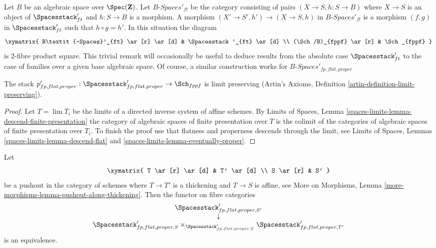 \begin{remark}
\label{remark-spaces-base-change}
Let $B$ be an algebraic space over $\Spec(\mathbf{Z})$.
Let $B\textit{-Spaces}'_{ft}$ be the category consisting
of pairs $(X \to S, h : S \to B)$
where $X \to S$ is an object of
$\Spacesstack'_{ft}$ and $h : S \to B$ is a morphism.
A morphism $(X' \to S', h') \to (X \to S, h)$
in $B\textit{-Spaces}'_{ft}$ is a morphism $(f, g)$
in $\Spacesstack'_{ft}$ such that $h \circ g = h'$.
In this situation the diagram
$$
\xymatrix{
B\textit{-Spaces}'_{ft} \ar[r] \ar[d] & \Spacesstack'_{ft} \ar[d] \\
(\Sch/B)_{fppf} \ar[r] & \Sch_{fppf}
}
$$
is $2$-fibre product square. This trivial remark
will occasionally be useful to deduce results from
the absolute case $\Spacesstack'_{ft}$ to the case
of families over a given base algebraic space.
Of course, a similar construction works for
$B\textit{-Spaces}'_{fp, flat, proper}$
\end{remark}

\begin{lemma}
\label{lemma-spaces-limits}
The stack
$p'_{fp, flat, proper} :
\Spacesstack'_{fp, flat, proper} \to \Sch_{fppf}$ is limit preserving
(Artin's Axioms, Definition \ref{artin-definition-limit-preserving}).
\end{lemma}

\begin{proof}
Let $T = \lim T_i$ be the limits of a
directed inverse system of affine schemes.
By Limits of Spaces, Lemma
\ref{spaces-limits-lemma-descend-finite-presentation}
the category of algebraic spaces of finite presentation
over $T$ is the colimit of the categories of algebraic spaces
of finite presentation over $T_i$.
To finish the proof use that flatness and properness
descends through the limit, see
Limits of Spaces, Lemmas
\ref{spaces-limits-lemma-descend-flat} and
\ref{spaces-limits-lemma-eventually-proper}.
\end{proof}

\begin{lemma}
\label{lemma-spaces-RS-star}
Let
$$
\xymatrix{
T \ar[r] \ar[d] & T' \ar[d] \\
S \ar[r] & S'
}
$$
be a pushout in the category of schemes where
$T \to T'$ is a thickening and $T \to S$ is affine, see
More on Morphisms, Lemma \ref{more-morphisms-lemma-pushout-along-thickening}.
Then the functor on fibre categories
$$
\begin{matrix}
\Spacesstack'_{fp, flat, proper, S'} \\
\downarrow \\
\Spacesstack'_{fp, flat, proper, S}
\times_{\Spacesstack'_{fp, flat, proper, T}}
\Spacesstack'_{fp, flat, proper, T'}
\end{matrix}
$$
is an equivalence.
\end{lemma}

